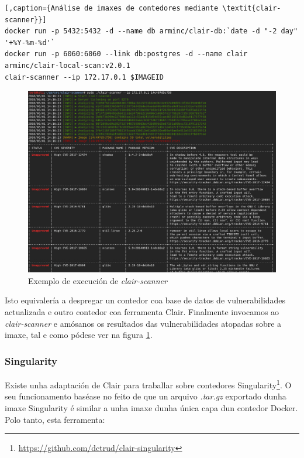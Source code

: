 \begin{lstlisting}[,caption={Análise de imaxes de contedores mediante \textit{clair-scanner}}]
docker run -p 5432:5432 -d --name db arminc/clair-db:`date -d "-2 day" '+%Y-%m-%d'`
docker run -p 6060:6060 --link db:postgres -d --name clair arminc/clair-local-scan:v2.0.1
clair-scanner --ip 172.17.0.1 $IMAGEID
\end{lstlisting}

\begin{figure}
\centerline{\includegraphics[width=15cm]{figuras/clairDocker.png}}
\caption{Exemplo de execución de {\it clair-scanner}}
\label{clairDocker}
\end{figure}

Isto equivalería a despregar un contedor coa base de datos de vulnerabilidades actualizada e outro contedor coa ferramenta Clair. Finalmente invocamos ao {\it clair-scanner} e amósanos os resultados das vulnerabilidades atopadas sobre a imaxe, tal e como pódese ver na figura \ref{clairDocker}.

\subsubsection{Singularity}

Existe unha adaptación de Clair para traballar sobre contedores Singularity\footnote{\url{https://github.com/dctrud/clair-singularity}}. O seu funcionamento baséase no feito de que un arquivo \textit{.tar.gz} exportado dunha imaxe Singularity é similar a unha imaxe dunha única capa dun contedor Docker. Polo tanto, esta ferramenta:

